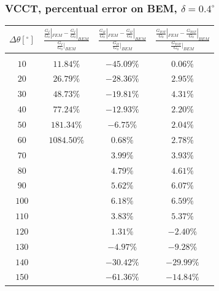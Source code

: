 \documentclass[first,firstsupp,lastsupp,handout,last,hyperref,table]{ETHclass}
\begin{document}
\begin{frame}
\frametitle{\small VCCT, percentual error on BEM, $\delta=0.4^{\circ}$}
\vspace{-0.5cm}
\scriptsize
\centering
\captionsetup[figure]{font=scriptsize,labelfont=scriptsize}
\begin{table}[htbp]
  \centering
    \begin{tabular}{cccc}
    $\Delta\theta \left[^{\circ}\right]$&$\frac{\frac{G_{I}}{G_{0}}|_{FEM}-\frac{G_{I}}{G_{0}}|_{BEM}}{\frac{G_{I}}{G_{0}}|_{BEM}}$&$\frac{\frac{G_{II}}{G_{0}}|_{FEM}-\frac{G_{II}}{G_{0}}|_{BEM}}{\frac{G_{II}}{G_{0}}|_{BEM}}$&$\frac{\frac{G_{TOT}}{G_{0}}|_{FEM}-\frac{G_{TOT}}{G_{0}}|_{BEM}}{\frac{G_{TOT}}{G_{0}}|_{BEM}}$\\
    \midrule\\
	$10$&$11.84\%$&$-45.09\%$&$0.06\%$\\
	$20$&$26.79\%$&$-28.36\%$&$2.95\%$\\
	$30$&$48.73\%$&$-19.81\%$&$4.31\%$\\
	$40$&$77.24\%$&$-12.93\%$&$2.20\%$\\
	$50$&$181.34\%$&$-6.75\%$&$2.04\%$\\
	$60$&$1084.50\%$&$0.68\%$&$2.78\%$\\
	$70$&&$3.99\%$&$3.93\%$\\
	$80$&&$4.79\%$&$4.61\%$\\
	$90$&&$5.62\%$&$6.07\%$\\
	$100$&&$6.18\%$&$6.59\%$\\
	$110$&&$3.83\%$&$5.37\%$\\
	$120$&&$1.31\%$&$-2.40\%$\\
	$130$&&$-4.97\%$&$-9.28\%$\\
	$140$&&$-30.42\%$&$-29.99\%$\\
	$150$&&$-61.36\%$&$-14.84\%$\\
    \end{tabular}%
  \label{tab:phaseprop}%
\end{table}%
\end{frame}
\end{document}
